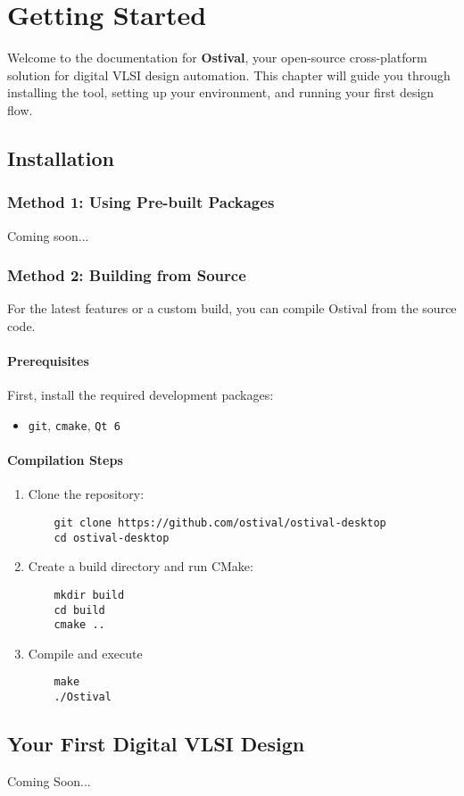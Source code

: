 \chapter{Getting Started}\label{ch:getting_started}

Welcome to the documentation for \textbf{Ostival}, your open-source cross-platform solution for digital VLSI design automation. This chapter will guide you through installing the tool, setting up your environment, and running your first design flow.

\section{Installation}

\subsection{Method 1: Using Pre-built Packages}
Coming soon...

\subsection{Method 2: Building from Source}
For the latest features or a custom build, you can compile Ostival from the source code.

\subsubsection{Prerequisites}
First, install the required development packages:
\begin{itemize}
    \item \texttt{git}, \texttt{cmake}, \texttt{Qt 6}
\end{itemize}

\subsubsection{Compilation Steps}
\begin{enumerate}
    \item Clone the repository:
    \begin{verbatim}
    git clone https://github.com/ostival/ostival-desktop
    cd ostival-desktop
    \end{verbatim}
    \item Create a build directory and run CMake:
    \begin{verbatim}
    mkdir build
    cd build
    cmake ..
    \end{verbatim}
    \item Compile and execute
    \begin{verbatim}
    make
    ./Ostival
    \end{verbatim}
\end{enumerate}

\section{Your First Digital VLSI Design}
Coming Soon...